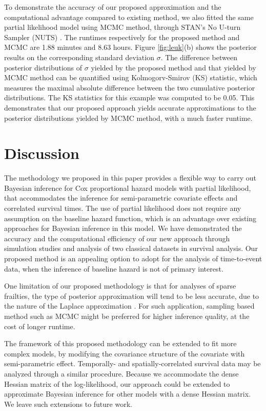 \documentclass[ba]{imsart}
\begin{document}
To demonstrate the accuracy of our proposed approximation and the computational advantage compared to existing method, we also fitted the same partial likelihood model using MCMC method, through STAN's No U-turn Sampler (NUTS) \citep{NUTS}. The runtimes respectively for the proposed method and MCMC are 1.88 minutes and 8.63 hours. Figure \ref{fig:leuk}(b) shows the posterior results on the corresponding standard deviation $\sigma$. The difference between posterior distributions of $\sigma$ yielded by the proposed method and that yielded by MCMC method can be quantified using Kolmogorv-Smirov (KS) statistic, which measures the maximal absolute difference between the two cumulative posterior distributions. The KS statistics for this example was computed to be 0.05. This demonstrates that our proposed approach yields accurate approximations to the posterior distributions yielded by MCMC method, with a much faster runtime.




\section{Discussion}\label{sec:discussion}


The methodology we proposed in this paper provides a flexible way to carry out Bayesian inference for Cox proportional hazard models with partial likelihood, that accommodates the inference for semi-parametric covariate effects and correlated survival times. The use of partial likelihood does not require any assumption on the baseline hazard function, which is an advantage over existing approaches for Bayesian inference in this model. We have demonstrated the accuracy and the computational efficiency of our new approach through simulation studies and analysis of two classical datasets in survival analysis. Our proposed method is an appealing option to adopt for the analysis of time-to-event data, when the inference of baseline hazard is not of primary interest.

One limitation of our proposed methodology is that for analyses of sparse frailties, the type of posterior approximation will tend to be less accurate, due to the nature of the Laplace approximation \citep{Ogden2013ASR}. For such application, sampling based method such as MCMC might be preferred for higher inference quality, at the cost of longer runtime. 

The framework of this proposed methodology can be extended to fit more complex models, by modifying the covariance structure of the covariate with semi-parametric effect. Temporally- and spatially-correlated survival data may be analyzed through a similar procedure. Because we accommodate the dense Hessian matrix of the log-likelihood, our approach could be extended to approximate Bayesian inference for other models with a dense Hessian matrix. We leave such extensions to future work.
\end{document}
